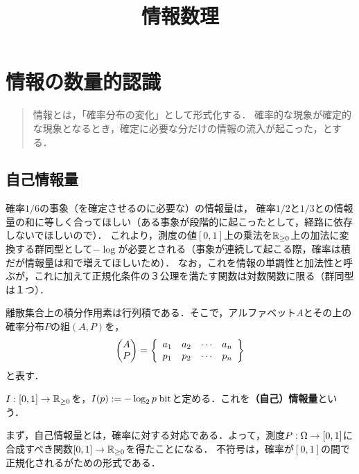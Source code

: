 \documentclass[uplatex,dvipdfmx]{jsreport}
\title{情報数理}
\author{}
\begin{document}
\tableofcontents

\chapter{情報の数量的認識}

\begin{quotation}
    情報とは，「確率分布の変化」として形式化する．
    確率的な現象が確定的な現象となるとき，確定に必要な分だけの情報の流入が起こった，とする．
\end{quotation}

\section{自己情報量}

\begin{tcolorbox}[colframe=ForestGreen, colback=ForestGreen!10!white,breakable,colbacktitle=ForestGreen!40!white,coltitle=black,fonttitle=\bfseries\sffamily,
title=情報量の形式化の仕方から，対数の登場は必然であった]
    確率$1/6$の事象（を確定させるのに必要な）の情報量は，
    確率$1/2$と$1/3$との情報量の和に等しく合ってほしい（ある事象が段階的に起こったとして，経路に依存しないでほしいので）．
    これより，測度の値$[0,1]$上の乗法を$\mathbb{R}_{\ge0}$上の加法に変換する群同型として$-\log$が必要とされる（事象が連続して起こる際，確率は積だが情報量は和で増えてほしいため）．
    なお，これを情報の単調性と加法性と呼ぶが，これに加えて正規化条件の３公理を満たす関数は対数関数に限る（群同型は１つ）．
\end{tcolorbox}

\begin{notation}
    離散集合上の積分作用素は行列積である．そこで，アルファベット$A$とその上の確率分布$P$の組$(A,P)$を，
    \[\begin{pmatrix}A\\P\end{pmatrix}=\left\{\begin{array}{cccc}a_1&a_2&\cdots&a_n\\p_1&p_2&\cdots&p_n\end{array}\right\}\]
    と表す．
\end{notation}

\begin{definition}
    $I:[0,1]\to\mathbb{R}_{\ge0}$を，$I(p):=-\log_2p\;\mathrm{bit}$と定める．これを\textbf{（自己）情報量}という．
\end{definition}
\begin{remarks}
    まず，自己情報量とは，確率に対する対応である．よって，測度$P:\Omega\to[0,1]$に合成すべき関数$[0,1]\to\mathbb{R}_{\ge0}$を得たことになる．
    不符号は，確率が$[0,1]$の間で正規化されるがための形式である．
\end{remarks}
\end{document}
